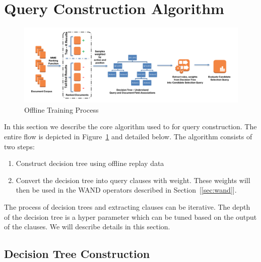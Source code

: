 \section{Query Construction Algorithm}

\begin{figure}
\centering
\includegraphics[width=\textwidth]{training-process.png}
\caption{Offline Training Process}
\label{fig:offline-training-process}
\end{figure}


In this section we describe the core algorithm used to for query construction.
The entire flow is depicted in Figure~\ref{fig:offline-training-process} and
detailed below.
The algorithm consists of two steps:
\begin{enumerate}
    \item Construct decision tree using offline replay data
    \item Convert the decision tree into query clauses with weight. These
    weights will then be used in the WAND operators described in Section~[\ref{sec:wand}].
\end{enumerate}

The process of decision trees and extracting clauses can be iterative. The depth of the decision tree is a hyper
parameter which can be tuned based on the output of the clauses. We will
describe details in this section.

\subsection{Decision Tree Construction}


